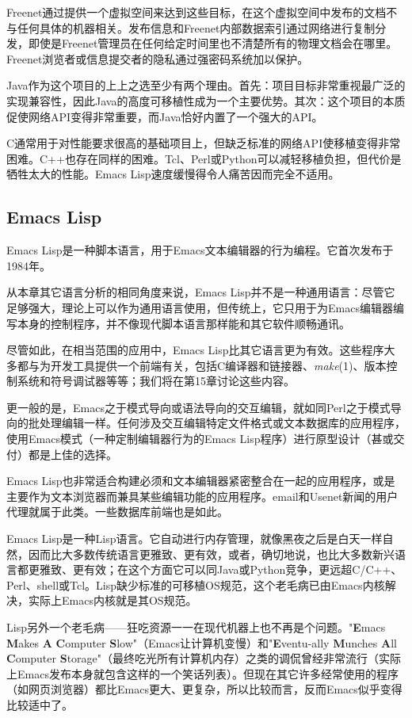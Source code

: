 \documentclass[12pt,oneside]{ctexbook}
\begin{document}
\begin{common-format}
Freenet通过提供一个虚拟空间来达到这些目标，在这个虚拟空间中发布的文档不与任何具体的机器相关。发布信息和Freenet内部数据索引通过网络进行复制分发，即使是Freenet管理员在任何给定时间里也不清楚所有的物理文档会在哪里。Freenet浏览者或信息提交者的隐私通过强密码系统加以保护。

Java作为这个项目的上上之选至少有两个理由。首先：项目目标非常重视最广泛的实现兼容性，因此Java的高度可移植性成为一个主要优势。其次：这个项目的本质促使网络API变得非常重要，而Java恰好内置了一个强大的API。

C通常用于对性能要求很高的基础项目上，但缺乏标准的网络API使移植变得非常困难。C++也存在同样的困难。Tcl、Perl或Python可以减轻移植负担，但代价是牺牲太大的性能。Emacs Lisp速度缓慢得令人痛苦因而完全不适用。

\subsection{Emacs Lisp}
Emacs Lisp是一种脚本语言，用于Emacs文本编辑器的行为编程。它首次发布于1984年。

从本章其它语言分析的相同角度来说，Emacs Lisp并不是一种通用语言：尽管它足够强大，理论上可以作为通用语言使用，但传统上，它只用于为Emacs编辑器编写本身的控制程序，并不像现代脚本语言那样能和其它软件顺畅通讯。

尽管如此，在相当范围的应用中，Emacs Lisp比其它语言更为有效。这些程序大多都与为开发工具提供一个前端有关，包括C编译器和链接器、\textit{make}(1)、版本控制系统和符号调试器等等；我们将在第15章讨论这些内容。

更一般的是，Emacs之于模式导向或语法导向的交互编辑，就如同Perl之于模式导向的批处理编辑一样。任何涉及交互编辑特定文件格式或文本数据库的应用程序，使用Emacs模式（一种定制编辑器行为的Emacs Lisp程序）进行原型设计（甚或交付）都是上佳的选择。

Emacs Lisp也非常适合构建必须和文本编辑器紧密整合在一起的应用程序，或是主要作为文本浏览器而兼具某些编辑功能的应用程序。email和Usenet新闻的用户代理就属于此类。一些数据库前端也是如此。

Emacs Lisp是一种Lisp语言。它自动进行内存管理，就像黑夜之后是白天一样自然，因而比大多数传统语言更雅致、更有效，或者，确切地说，也比大多数新兴语言都更雅致、更有效；在这个方面它可以同Java或Python竞争，更远超C/C++、Perl、shell或Tcl。Lisp缺少标准的可移植OS规范，这个老毛病已由Emacs内核解决，实际上Emacs内核就是其OS规范。

Lisp另外一个老毛病——狂吃资源一一在现代机器上也不再是个问题。"\textbf{E}macs \textbf{M}akes \textbf{A} \textbf{C}omputer \textbf{S}low"（Emacs让计算机变慢）和"\textbf{E}ventu-ally \textbf{M}unches \textbf{A}ll \textbf{C}omputer \textbf{S}torage"（最终吃光所有计算机内存）之类的调侃曾经非常流行（实际上Emacs发布本身就包含这样的一个笑话列表）。但现在其它许多经常使用的程序（如网页浏览器）都比Emacs更大、更复杂，所以比较而言，反而Emacs似乎变得比较适中了。


\end{common-format}
\end{document}
